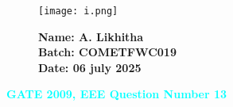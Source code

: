\documentclass[12pt]{article}
\begin{document}
\begin{figure}[H]
    \begin{minipage}{0.45\textwidth}
        \texttt{[image: i.png]} %
    \end{minipage} \hfill
    \begin{minipage}{0.45\textwidth}
        \textbf{Name: A. Likhitha} \\
        \textbf{Batch: COMETFWC019} \\
        \textbf{Date: 06 july 2025}
    \end{minipage}
\end{figure}

\begin{center}
    {\LARGE \textbf{\textcolor{cyan}{GATE 2009, EEE Question Number 13}}}
\end{center}
\vspace{1em}
\end{document}

